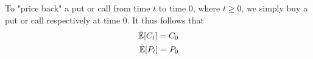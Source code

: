 \documentclass[reqno]{amsart}
\newcommand{\rE}[1]{\tilde{\E}[#1]}
\begin{document}
To "price back" a put or call from time $t$ to time $0$, where $t \geq 0$, we simply buy a put or call respectively at time $0$. 
It thus follows that 
\begin{align} \label{replicating puts/calls}
     \rE{C_t} = C_0 \\
     \rE{P_t} = P_0
\end{align}

\end{document}
